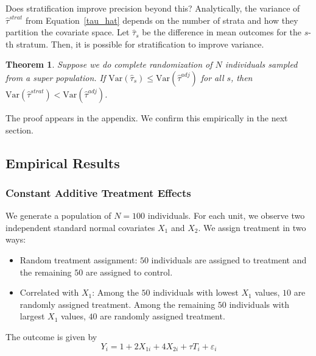 \documentclass[12pt]{article}
\newtheorem{theorem}{Theorem}[section]
\newcommand{\var}{\textrm{Var}}
\newcommand{\eps}{\varepsilon}
\begin{document}
Does stratification improve precision beyond this?
Analytically, the variance of $\hat{\tau}^{strat}$ from Equation~\ref{tau_hat} depends on the number of strata and how they partition the covariate space.
Let $\hat{\tau}_s$ be the difference in mean outcomes for the $s$-th stratum.
Then, it is possible for stratification to improve variance.

\begin{theorem}\label{thm:var_tau_hat_stratified}
Suppose we do complete randomization of $N$ individuals sampled from a super population.
If $\var(\hat{\tau}_s) \leq \var(\hat{\tau}^{adj})$ for all $s$, then $\var(\hat{\tau}^{strat}) < \var(\hat{\tau}^{adj})$.
\end{theorem}

\noindent The proof appears in the appendix.
We confirm this empirically in the next section.

\subsection{Empirical Results}\label{estimation_simulations}

\subsubsection{Constant Additive Treatment Effects}\label{estimate_cate}
We generate a population of $N=100$ individuals.
For each unit, we observe two independent standard normal covariates $X_1$ and $X_2$.
We assign treatment in two ways:
\begin{itemize}
\item Random treatment assignment: $50$ individuals are assigned to treatment and the remaining $50$ are assigned to control.
\item Correlated with $X_1$: Among the $50$ individuals with lowest $X_1$ values, $10$ are randomly assigned treatment. 
Among the remaining $50$ individuals with largest $X_1$ values, $40$ are randomly assigned treatment.
\end{itemize}

\noindent The outcome is given by
$$Y_i = 1 + 2X_{1i} + 4X_{2i} + \tau T_i + \eps_i$$
\end{document}
